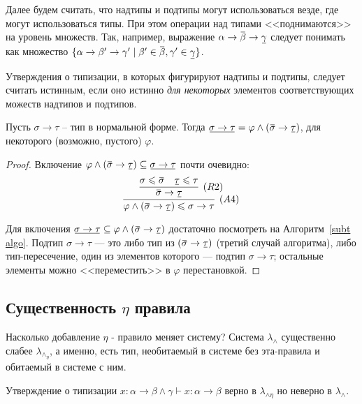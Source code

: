 \documentclass{spbau-diploma}
\begin{document}
Далее будем считать, что надтипы и подтипы могут использоваться везде, где могут использоваться типы. При этом операции над типами <<поднимаются>> на уровень множеств. Так, например, выражение $\alpha \to \ob{\beta} \to \ub{\gamma}$ следует понимать как множество $\{ \alpha \to \beta' \to \gamma' \mid \beta' \in \ob{\beta}, \gamma' \in \ub{\gamma} \}$.

Утверждения о типизации, в которых фигурируют надтипы и подтипы, следует считать истинным, если оно истинно {\it для некоторых} элементов соответствующих можеств надтипов и подтипов.

\begin{lemma} \label{подтип стрелки}
Пусть $\sigma \to \tau$ -- тип в нормальной форме. Тогда
$\ub{\sigma \to \tau} = \varphi \wedge (\ob{\sigma} \to \ub{\tau})$,
для некоторого (возможно, пустого) $\varphi$.

\end{lemma}

\begin{proof}
    Включение $\varphi \wedge (\ob{\sigma} \to \ub{\tau}) \subseteq \ub{\sigma \to \tau}$ почти очевидно: 
    $$\infer[(A4)]{\varphi \wedge (\ob{\sigma} \to \ub{\tau}) \leqslant \sigma \to \tau}
                  {\infer[(R2)]{\ob{\sigma} \to \ub{\tau}}
                               {\sigma \leqslant \ob{\sigma} & \ub{\tau} \leqslant \tau}}$$
                               
    Для включения $\ub{\sigma \to \tau} \subseteq \varphi \wedge (\ob{\sigma} \to \ub{\tau})$ достаточно посмотреть на Алгоритм~\ref{subt algo}. Подтип $\sigma \to \tau$ --- это либо тип из $(\ob{\sigma} \to \ub{\tau})$ (третий случай алгоритма), либо тип-пересечение, один из элементов которого --- подтип $\sigma \to \tau$; остальные элементы можно <<переместить>> в $\varphi$ перестановкой.
\end{proof}


\subsection{Существенность $\eta$ правила}

Насколько добавление $\eta$ - правило меняет систему? 
Система $\lambda_\wedge$ существенно слабее $\lambda_\wedge_\eta$, а именно, есть тип, необитаемый в системе без эта-правила и обитаемый в системе с ним. 

\begin{lemma} \label{существенность: типизация}
Утверждение о типизации $x : \alpha \to \beta \wedge \gamma \vdash x : \alpha \to \beta$ верно в $\lambda_{\wedge \eta}$ но неверно в $\lambda_{\wedge}$.
\end{lemma}
\end{document}
